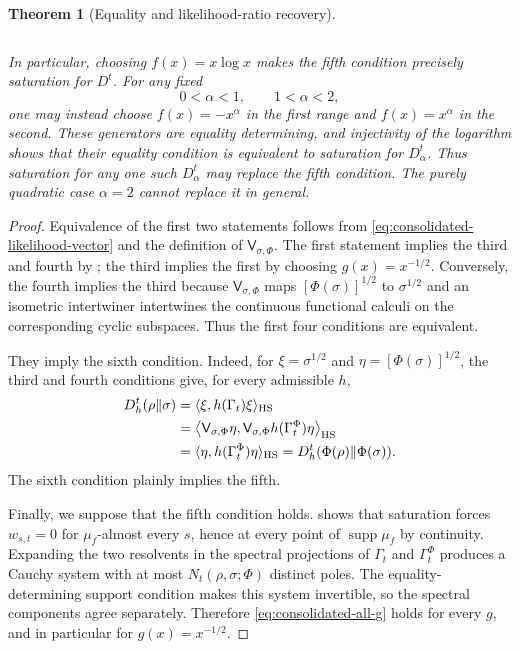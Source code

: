 \documentclass[11pt]{article}
\newtheorem{theorem}[theorem]{Theorem}
\theoremstyle{remark}
\DeclareMathOperator{\supp}{supp}
\newcommand{\1}{\mathbbm{1}}
\begin{document}
\begin{theorem}[Equality and likelihood-ratio recovery]
\begin{enumerate}
\begin{equation}
 \label{eq:consolidated-all-Dht-equality}
\end{equation}
\end{enumerate}
In particular, choosing $f(x)=x\log x$ makes the fifth condition
precisely saturation for $D^t$.  For any fixed
\begin{equation}
 0<\alpha<1,\qquad 1<\alpha<2,
\end{equation}
one may instead choose $f(x)=-x^\alpha$ in the first range and
$f(x)=x^\alpha$ in the second.  These generators are equality
determining, and injectivity of the logarithm shows that their
equality condition is equivalent to saturation for $D_\alpha^t$.
Thus saturation for any one such $D_\alpha^t$ may replace the fifth
condition.  The purely quadratic case $\alpha=2$ cannot replace it in
general.
\end{theorem}

\begin{proof}
Equivalence of the first two statements follows from
\eqref{eq:consolidated-likelihood-vector} and the definition of
$\mathsf V_{\sigma,\Phi}$.  The first statement implies the third
and fourth by
; the third implies
the first by choosing $g(x)=x^{-1/2}$.  Conversely, the fourth
implies the third because $\mathsf V_{\sigma,\Phi}$ maps
$[\Phi(\sigma)]^{1/2}$ to $\sigma^{1/2}$ and an isometric
intertwiner intertwines the continuous functional calculi on the
corresponding cyclic subspaces.  Thus the first four conditions are
equivalent.

They imply the sixth condition.  Indeed, for
$\xi=\sigma^{1/2}$ and $\eta=[\Phi(\sigma)]^{1/2}$, the third and
fourth conditions give, for every admissible $h$,
\begin{align}
 D_h^t(\rho\Vert\sigma)
 &=\langle \xi,h(\Gamma_t)\xi\rangle_{\rm HS}\notag\\
 &=\left\langle \mathsf V_{\sigma,\Phi}\eta,
 \mathsf V_{\sigma,\Phi}h(\Gamma_t^\Phi)\eta
 \right\rangle_{\rm HS}\notag\\
 &=\langle \eta,h(\Gamma_t^\Phi)\eta\rangle_{\rm HS}
 =D_h^t(\Phi(\rho)\Vert\Phi(\sigma)).
 \label{eq:consolidated-functional-calculus-DPI-equality}
\end{align}
The sixth condition plainly implies the fifth.

Finally, we suppose that the fifth condition holds.
 shows that saturation forces
$w_{s,t}=0$ for
$\mu_f$-almost every $s$, hence at every point of
$\supp\mu_f$ by continuity.  Expanding the two resolvents in the
spectral projections of $\Gamma_t$ and $\Gamma_t^\Phi$ produces
a Cauchy system with at most
$N_t(\rho,\sigma;\Phi)$ distinct poles.  The
equality-determining support condition makes this system
invertible, so the spectral components agree separately.  Therefore
\eqref{eq:consolidated-all-g} holds for every $g$, and in
particular for $g(x)=x^{-1/2}$.
\end{proof}
\end{document}
